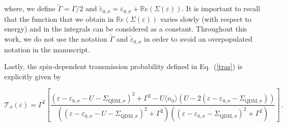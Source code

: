 \documentclass[aps,twocolumn,prb,superscript,floatfix,superscriptaddress,showpacs]{revtex4-1}
\newcommand{\ve}{\varepsilon}
\begin{document}
where, we define $\tilde{\Gamma}=\Gamma/2$ and $\tilde{\ve}_{0,\sigma}=\ve_{0,\sigma}+\mathbb{R}e \left(\Sigma(\ve)\right)$. It is important to recall that the function that we obtain in $\mathbb{R}e \left(\Sigma(\ve)\right)$ varies slowly (with respect to energy) and in the integrals can be considered as a constant. Throughout this work, we do not use the notation $\tilde{\Gamma}$ and $\tilde{\ve}_{0,\sigma}$ in order to avoid an overpopulated notation in the manuscript.

Lastly, the spin-dependent transmission probability defined in Eq.\ (\ref{tras}) is explicitly given by
\begin{widetext}
\begin{equation}
\mathcal{T}_{\sigma}(\ve)=\Gamma^2\left[\frac{(\ve-\ve_{0,\sigma}-U-\Sigma_{\text{QDM},\sigma})^2+\Gamma^2-U\langle n_{\bar{\sigma}}\rangle(U-2(\ve-\ve_{0,\sigma}-\Sigma_{\text{QDM},\sigma}))}{((\ve-\ve_{0,\sigma}-U-\Sigma_{\text{QDM},\sigma})^2+\Gamma^2)((\ve-\ve_{0,\sigma}-\Sigma_{\text{QDM},\sigma})^2+\Gamma^2)}\right]\,.
\end{equation}
\end{widetext}
\noindent




\end{document}
